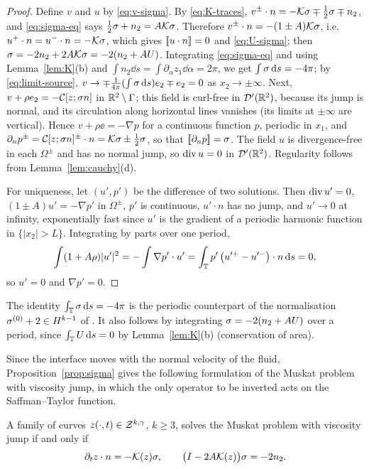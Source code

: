 \begin{proof}
Define $v$ and $u$ by \eqref{eq:v-sigma}. By \eqref{eq:K-traces}, $v^\pm\cdot n=-\mathcal{K}\sigma\mp\frac12\sigma\mp n_2$, and \eqref{eq:sigma-eq} says $\frac12\sigma+n_2=A\mathcal{K}\sigma$. Therefore
$v^\pm\cdot n=-(1\pm A)\mathcal{K}\sigma$, i.e.\ $u^+\cdot n=u^-\cdot n=-\mathcal{K}\sigma$, which gives $[\![u\cdot n]\!]=0$ and \eqref{eq:U-sigma}; then $\sigma=-2n_2+2A\mathcal{K}\sigma=-2(n_2+AU)$.
Integrating \eqref{eq:sigma-eq} and using Lemma~\ref{lem:K}(b) and $\int n_2\dd s=\int\partial_\alpha z_1\dd\alpha=2\pi$, we get $\int\sigma\,\mathrm{d} s=-4\pi$; by \eqref{eq:limit-source},
$v\to\mp\frac1{4\pi}(\int\sigma\,\mathrm{d} s)e_2\mp e_2=0$ as $x_2\to\pm\infty$. Next, $v+\rho e_2=-\mathcal{C}[z;\sigma n]$ in $\mathbb{R}^2\setminus\Gamma$; this field is curl-free in $\mathcal D'(\mathbb{R}^2)$, because its jump is normal,
and its circulation along horizontal lines vanishes (its limits at $\pm\infty$ are vertical). Hence $v+\rho\ee=-\nabla p$ for a continuous function $p$, periodic in $x_1$, and
$\partial_np^\pm=\mathcal{C}[z;\sigma n]^\pm\cdot n=\mathcal{K}\sigma\pm\frac12\sigma$, so that $[\![\partial_np]\!]=\sigma$. The field $u$ is divergence-free in each $\Omega^\pm$ and has no normal jump, so $\operatorname{div} u=0$ in
$\mathcal D'(\mathbb{R}^2)$. Regularity follows from Lemma~\ref{lem:cauchy}(d).

For uniqueness, let $(u',p')$ be the difference of two solutions. Then $\operatorname{div} u'=0$, $(1\pm A)u'=-\nabla p'$ in $\Omega^\pm$, $p'$ is continuous, $u'\cdot n$ has no jump, and $u'\to0$ at infinity,
exponentially fast since $u'$ is the gradient of a periodic harmonic function in $\{|x_2|>L\}$. Integrating by parts over one period,
\[
\int(1+A\rho)|u'|^2=-\int\nabla p'\cdot u'=\int_{\mathbb{T}} p'\,\big(u'^+-u'^-\big)\cdot n\,\mathrm{d} s=0,
\]
so $u'=0$ and $\nabla p'=0$.
\end{proof}

The identity $\int_{\mathbb{T}}\sigma\,\mathrm{d} s=-4\pi$ is the periodic counterpart of the normalisation $\sigma^{(0)}+2\in H^{k-1}$ of \cite[Prop.~6.3]{LM26}. It also follows by integrating
$\sigma=-2(n_2+AU)$ over a period, since $\int_{\mathbb{T}} U\,\mathrm{d} s=0$ by Lemma~\ref{lem:K}(b) (conservation of area).

Since the interface moves with the normal velocity of the fluid, Proposition~\ref{prop:sigma} gives the following formulation of the Muskat problem with viscosity jump, in which the only
operator to be inverted acts on the Saffman--Taylor function.

\begin{corollary}\label{cor:muskat}
A family of curves $z(\cdot,t)\in\mathcal{Z}^{k,\gamma}$, $k\ge3$, solves the Muskat problem with viscosity jump if and only if
\[
\partial_t z\cdot n=-\mathcal{K}(z)\sigma,\qquad \big(I-2A\mathcal{K}(z)\big)\sigma=-2n_2 .
\]
\end{corollary}

